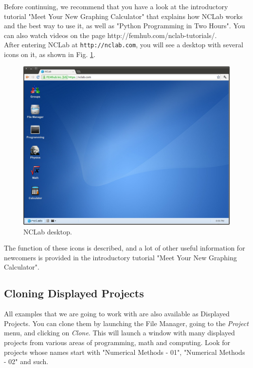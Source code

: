 \documentclass{article}
\begin{document}
\noindent
Before continuing, we recommend 
that you have a look at the introductory tutorial "Meet Your New Graphing 
Calculator" that explains how NCLab works and the best way to use it, as well as 
"Python Programming in Two Hours". You can also watch videos on the page 
http://femhub.com/nclab-tutorials/.\\

\noindent
After entering NCLab at {\tt http://nclab.com}, you will see a desktop with several icons on it,
as shown in Fig. \ref{fig:desktop}. 

\begin{figure}[!ht]
\begin{center}
\includegraphics[width=\textwidth]{img/desktop.png}
\end{center}
\caption{NCLab desktop.}
\label{fig:desktop}
\end{figure}
\newpage
\noindent
The function of these icons is described, and a lot of other useful information for newcomers 
is provided in the introductory tutorial "Meet Your New Graphing Calculator". \\

\subsection{Cloning Displayed Projects}

All examples that we are going to work with are also available 
as Displayed Projects. You can clone them by launching the File
Manager, going to the {\em Project} menu, and clicking on {\em Clone}. This will launch 
a window with many displayed projects from various areas of programming,
math and computing. Look for projects whose names start with "Numerical Methods - 01",
"Numerical Methods - 02" and such.
\end{document}
